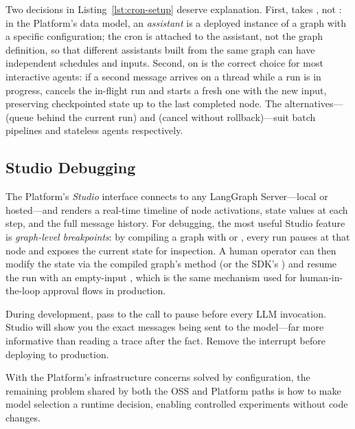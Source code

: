 Two decisions in Listing~\ref{lst:cron-setup} deserve explanation. First,
 takes , not : in
the Platform's data model, an \emph{assistant} is a deployed instance of a
graph with a specific configuration; the cron is attached to the assistant,
not the graph definition, so that different assistants built from the same
graph can have independent schedules and inputs. Second,
 on  is the correct
choice for most interactive agents: if a second message arrives on a thread
while a run is in progress,  cancels the in-flight run and
starts a fresh one with the new input, preserving checkpointed state up to the
last completed node. The alternatives--- (queue behind the
current run) and  (cancel without rollback)---suit batch
pipelines and stateless agents respectively.

\subsection*{Studio Debugging}

The Platform's \emph{Studio} interface connects to any LangGraph Server---local
 or hosted---and renders a real-time timeline of node
activations, state values at each step, and the full message history. For
debugging, the most useful Studio feature is \emph{graph-level breakpoints}:
by compiling a graph with  or
, every run pauses at that node and
exposes the current state for inspection. A human operator can then modify
the state via the compiled graph's  method (or the
SDK's ) and resume the run with an
empty-input , which is the same mechanism used for
human-in-the-loop approval flows in production.

\begin{tipbox}
  During development, pass  to the
   call to pause before every LLM invocation. Studio will
  show you the exact messages being sent to the model---far more informative
  than reading a trace after the fact. Remove the interrupt before deploying
  to production.
\end{tipbox}

With the Platform's infrastructure concerns solved by configuration, the
remaining problem shared by both the OSS and Platform paths is how to make
model selection a runtime decision, enabling controlled experiments without
code changes.

